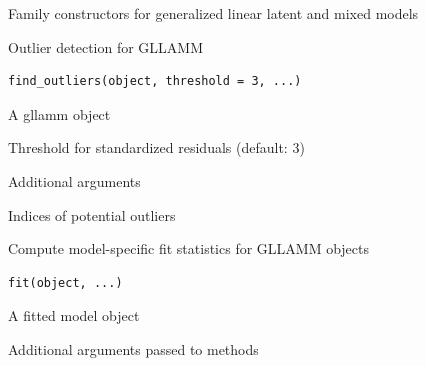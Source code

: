 \documentclass[a4paper]{book}
\begin{document}
%
\begin{Description}
Family constructors for generalized linear latent and mixed models
\end{Description}
%
\begin{Description}
Outlier detection for GLLAMM
\end{Description}
%
\begin{Usage}
\begin{verbatim}
find_outliers(object, threshold = 3, ...)
\end{verbatim}
\end{Usage}
%
\begin{Arguments}
\begin{ldescription}
\item[\code{object}] A gllamm object

\item[\code{threshold}] Threshold for standardized residuals (default: 3)

\item[\code{...}] Additional arguments
\end{ldescription}
\end{Arguments}
%
\begin{Value}
Indices of potential outliers
\end{Value}
%
\begin{Description}
Compute model-specific fit statistics for GLLAMM objects
\end{Description}
%
\begin{Usage}
\begin{verbatim}
fit(object, ...)
\end{verbatim}
\end{Usage}
%
\begin{Arguments}
\begin{ldescription}
\item[\code{object}] A fitted model object

\item[\code{...}] Additional arguments passed to methods
\end{ldescription}
\end{Arguments}
%
\end{document}
